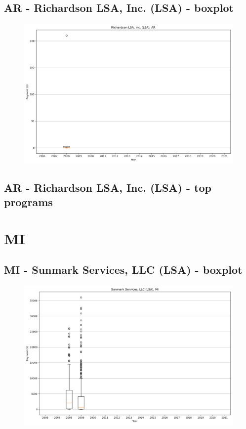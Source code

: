 \subsection*{AR - Richardson LSA, Inc. (LSA) - boxplot}
\begin{figure}[h]
\centering
\includegraphics[width=7in]{../output/boxplots/counties/Richardson LSA, Inc. (LSA)-AR_boxplot.png}
\end{figure}


\subsection*{AR - Richardson LSA, Inc. (LSA) - top programs}

\newpage
\section*{MI}
\subsection*{MI - Sunmark Services, LLC (LSA) - boxplot}
\begin{figure}[h]
\centering
\includegraphics[width=7in]{../output/boxplots/counties/Sunmark Services, LLC (LSA)-MI_boxplot.png}
\end{figure}


